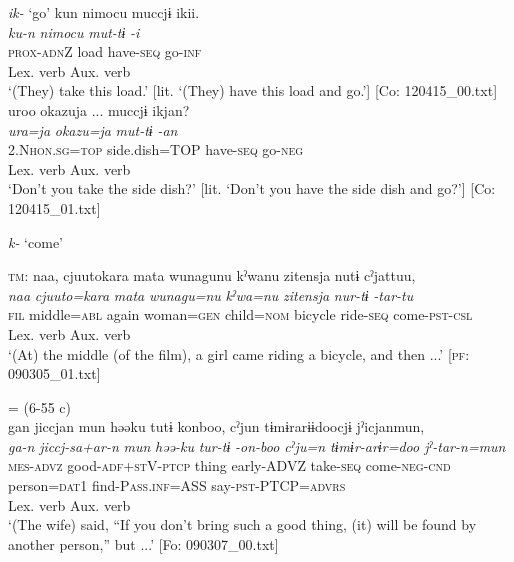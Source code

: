 \ea  
\exi{}\textit{ik-} ‘go’ \label{ex:9.20}
\ea %
   \gllll   kun  {\textbar}nimocu{\textbar}  muccjɨ  ikii.\\
      \textit{ku-n}  \textit{nimocu}  \textit{mut-tɨ}  \textit{-i}\\
      \textsc{prox}-\textsc{adn}Z  load  have-\textsc{seq}  go-\textsc{inf}\\
          Lex. verb  Aux. verb\\
      \glt       ‘(They) take this load.’ [lit. ‘(They) have this load and go.’] [Co: 120415\_00.txt]
\ex 
\gllll   uroo  {\textbar}okazu{\textbar}ja  ...  muccjɨ  ikjan?\\
      \textit{ura=ja}  \textit{okazu=ja}    \textit{mut-tɨ}  \textit{-an}\\
      2.N\textsc{hon}.\textsc{sg}=\textsc{top}  side.dish=TOP    have-\textsc{seq}  go-\textsc{neg}\\
            Lex. verb  Aux. verb\\
      \glt       ‘Don’t you take the side dish?’ [lit. ‘Don’t you have the side dish and go?’] [Co: 120415\_01.txt]

\exi{} \textit{k-} ‘come’

\ex %
\gllll  \textsc{tm}:  naa,  cjuutokara  mata  wunagunu  kˀwanu  {\textbar}zitensja{\textbar} nutɨ  cˀjattuu,\\
      \textit{naa}  \textit{cjuuto=kara}  \textit{mata}  \textit{wunagu=nu}  \textit{kˀwa=nu}  \textit{zitensja}  \textit{nur-tɨ}  \textit{-tar-tu}\\
      \textsc{fil}  middle=\textsc{abl}  again  woman=\textsc{gen}  child=\textsc{nom}  bicycle    ride-\textsc{seq}  come-\textsc{pst}-\textsc{csl}\\
                                                             Lex. verb  Aux. verb\\
      \glt       ‘(At) the middle (of the film), a girl came riding a bicycle, and then ...’ [\textsc{pf}: 090305\_01.txt]

\ex{} = (6-55 c)\\
    \gllll gan  jiccjan  mun  həəku  tutɨ  konboo,  cˀjun  tɨmɨrarɨɨdoocjɨ  jˀicjanmun,\\
      \textit{ga-n}  \textit{jiccj-sa+ar-n}  \textit{mun}  \textit{həə-ku}  \textit{tur-tɨ} \textit{-on-boo  cˀju=n  tɨmɨr-arɨr=doo  jˀ-tar-n=mun}\\
      \textsc{mes}-\textsc{advz}  good-\textsc{adf}+\textsc{st}V-\textsc{ptcp}  thing  early-ADVZ  take-\textsc{seq}  come-\textsc{neg}-\textsc{cnd}  person=\textsc{dat}1  find-P\textsc{ass}.\textsc{inf}=ASS  say-\textsc{pst}-PTCP=\textsc{advrs}\\
              Lex. verb                                          Aux. verb \\              
      \glt ‘(The wife) said, “If you don’t bring such a good thing, (it) will be found by another person,” but ...’   [Fo: 090307\_00.txt]
    \z
\z

